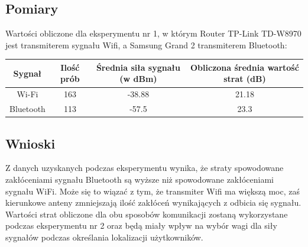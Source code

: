 \subsection{Pomiary}
	Wartości obliczone dla eksperymentu nr 1, w którym Router TP-Link TD-W8970 jest transmiterem sygnału Wifi, a Samsung Grand 2 transmiterem Bluetooth:
	\begin{center}
		\begin{minipage}{\linewidth}
			\begin{tabular}{|c|c|c|c|}
				\hline 
				Sygnał & Ilość prób & Średnia siła sygnału (w dBm) & Obliczona średnia wartość strat (dB) \\ 
				\hline 
				Wi-Fi & 163 & -38.88 & 21.18 \\ 
				\hline 
				Bluetooth & 113 & -57.5 & 23.3 \\ 
				\hline 
			\end{tabular} 
		\end{minipage} 
	\end{center}
\subsection{Wnioski}
Z danych uzyskanych podczas eksperymentu wynika, że straty spowodowane zakłóceniami sygnału Bluetooth są wyższe niż spowodowane zakłóceniami sygnału WiFi. Może się to wiązać z tym, że transmiter Wifi ma większą moc, zaś kierunkowe anteny zmniejszają ilość zakłóceń wynikających z odbicia się sygnału. Wartości strat obliczone dla obu sposobów komunikacji zostaną wykorzystane podczas eksperymentu nr 2 oraz będą miały wpływ na wybór wagi dla siły sygnałów podczas określania lokalizacji użytkowników.
